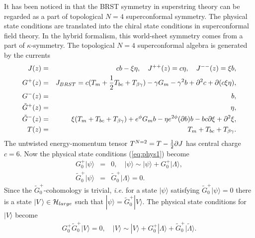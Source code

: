 \documentclass[a4paper,12pt]{article}
\begin{document}
It has been noticed in \cite{BeVa} that the BRST symmetry in 
superstring theory can be regarded as a part of topological 
$N=4$ superconformal symmetry.
The physical state conditions are translated into the chiral state
conditions in superconformal field theory.
In the hybrid formalism, this world-sheet symmetry comes from a part of
$\kappa$-symmetry\cite{Be,STVZ}.
The topological $N=4$ superconformal algebra is generated by the 
currents
\begin{eqnarray}
 J(z)&=&cb-\xi\eta, \quad
J^{++}(z)=c\eta,\quad
J^{--}(z)= \xi b, 
\nonumber\\
G^{+}(z)&=& J_{BRST}=
c(T_{m}+{1\over2}T_{bc}+T_{\beta\gamma})-\gamma G_{m}-\gamma^{2}b 
+\partial^{2}c +\partial(c\xi\eta), \nonumber\\
G^{-}(z)&=& b,\nonumber\\
\tilde{G}^{+}(z)&=&\eta, \nonumber\\
\tilde{G}^{-}(z)&=& \xi (T_{m}+T_{bc}+T_{\beta\gamma})+ e^{\phi}G_{m}b 
-\eta e^{2\phi} (\partial b) b -b c\partial\xi+\partial^{2} \xi,
\nonumber\\
T(z)&=& T_{m}+T_{bc}+T_{\beta\gamma}.
\label{eq:top}
\end{eqnarray}
The untwisted energy-momentum tensor $T^{N=2}=T-{1\over2}\partial
J$
has central charge $c=6$.
Now the physical state conditions (\ref{eq:phys1}) become
\begin{eqnarray}
G^{+}_{0}|\psi\rangle&=&0, \quad
|\psi\rangle\sim |\psi\rangle+G^{+}_{0}|\Lambda\rangle,\nonumber\\
\tilde{G}^{+}_{0}|\psi\rangle&=&\tilde{G}^{+}_{0}|\Lambda\rangle=0.
\label{eq:phys2}
\end{eqnarray}
Since the $\tilde{G}^{+}_{0}$-cohomology is trivial, {\it i.e.}
for a state $|\psi\rangle$ satisfying $\tilde{G}^{+}_{0}|\psi\rangle=0$
there is a state $|V\rangle\in {\cal H}_{large}$ such that
$|\psi\rangle=\tilde{G}^{+}_{0}|V\rangle$.
The physical state conditions  for $|V\rangle$
become
\begin{eqnarray}
 G^{+}_{0}\tilde{G}^{+}_{0}|V\rangle=0,\quad
|V\rangle\sim |V\rangle+
G^{+}_{0}|\Lambda\rangle+\tilde{G}^{+}_{0}|\tilde{\Lambda}\rangle.
\end{eqnarray}
\end{document}
